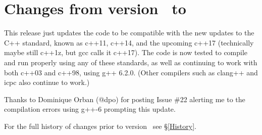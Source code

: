 
\section{Changes from version \prevtmvversion\ to \tmvversion}
\label{Changes}

This release just updates the code to be compatible with the new updates to
the C++ standard, known as c++11, c++14, and the upcoming c++17 (technically
maybe still c++1z, but gcc calls it c++17).  The code is now tested to compile
and run properly using any of these standards, as well as continuing to work
with both c++03 and c++98, using g++ 6.2.0.  (Other compilers such as clang++
and icpc also continue to work.)

Thanks to Dominique Orban (@dpo) for posting Issue \#22 alerting me to the
compilation errors using g++-6 prompting this update.

For the full history of changes prior to version \tmvversion\ see \S\ref{History}.
